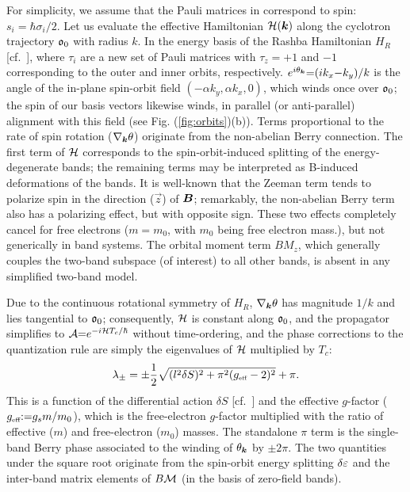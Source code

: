 \documentclass[aps, prb, showpacs, twocolumn, notitlepage, superscriptaddress]{revtex4-1}
\begin{document}
For simplicity, we assume that the Pauli matrices in  correspond to spin: $s_i{=}\hbar \sigma_i/2$. Let us evaluate the effective Hamiltonian ${\cal H}(\boldsymbol{k})$  along the cyclotron trajectory $\mathfrak{o}_0$ with radius $k$. In the  energy basis of the Rashba Hamiltonian $H_R$ [cf.\ ], 
where $\tau_i$ are a new set of Pauli matrices with $\tau_z{=}{+} 1$ and ${-}1$ corresponding to the outer and inner orbits, respectively. $e^{i\theta_{\boldsymbol{k}}}{=}(ik_x{-}k_y)/k$ is the angle of the in-plane spin-orbit field $({-}\alpha k_y,\alpha k_x,0)$, which winds once over $\mathfrak{o}_0$; the spin of our basis vectors likewise winds, in parallel (or anti-parallel) alignment with this field (see Fig. (\ref{fig:orbits})(b)). Terms proportional to the rate of spin rotation  ($\nabla_{\boldsymbol{k}} \theta$) originate from the  non-abelian Berry connection. The first term of  ${\cal H}$ corresponds to the spin-orbit-induced splitting of the energy-degenerate bands;
the remaining terms may be interpreted as B-induced deformations of the bands.   It is well-known that the Zeeman term tends to polarize spin in the direction ($\vec{z}$) of $\boldsymbol{B}$; remarkably, the non-abelian Berry term   also has a polarizing effect, but with opposite sign. These two effects completely cancel for free electrons ($m{=}m_0$, with $m_0$ being free electron mass.), but not generically in band systems. The orbital moment term $B M_z$, which generally couples the two-band subspace (of interest) to all other bands, is absent in any simplified two-band model.

Due to the continuous rotational symmetry of $H_R$, $\nabla_{\boldsymbol{k}} \theta$ has magnitude $1/k$ and lies tangential to $\mathfrak{o}_0$; consequently, ${\cal H}$ is constant along $\mathfrak{o}_0$, and the propagator simplifies to ${\cal A}{=}e^{{-}i{\cal H} T_c/\hbar}$ without time-ordering, and the phase corrections to the quantization rule are simply the eigenvalues of ${\cal H}$ multiplied by $T_c$:
\begin{equation}
\lambda_{\pm}=\pm\frac{1}{2}\sqrt{({l^2\delta S})^2+\pi^2(g_{\scriptscriptstyle{\text{eff}}}-2)^2}+\pi. \label{eq:Rashba-lambda}
\end{equation}
This is a function of the differential action $\delta S$ [cf.\ ] and  the effective  $g$-factor ($g_{\scriptscriptstyle{\text{eff}}}{:}{=}g_sm/m_0$), which is the free-electron $g$-factor multiplied with the ratio of  effective ($m$) and free-electron ($m_0$) masses. The standalone $\pi$ term is the single-band Berry phase associated to the winding of $\theta_{\boldsymbol{k}}$ by ${\pm}2\pi$. The two quantities under the square root originate from the spin-orbit energy splitting $\delta \varepsilon$ and the inter-band matrix elements of $B{\cal M}$ (in the basis of zero-field bands). 
\end{document}
